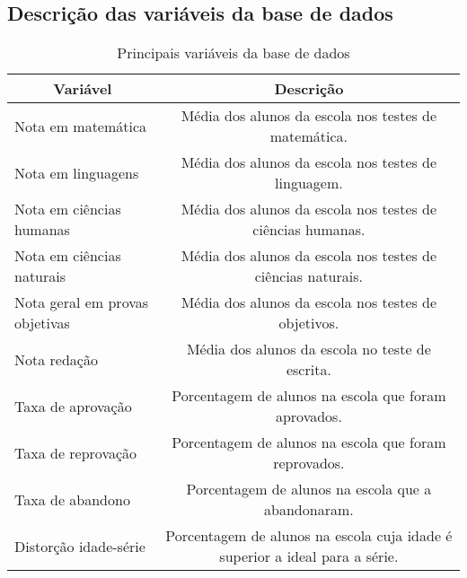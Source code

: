 \documentclass[
        12pt,                           %
        openright,                      %
        oneside,
        a4paper,                        %
        chapter=TITLE,         %
        section=TITLE,         %
        subsection=Title,      %
        english,                        %
        spanish,                        %
        portugues,                      %
        ]{abntex2}
\begin{document}
{%
\begin{apendicesenv}
%
\begin{landscape}

\chapter{Descrição das variáveis da base de dados}\label{apendice_descricao}


\begin{longtable}{cc}
\caption{Principais variáveis da base de dados}\label{tab:descricao_base}

\\ \hline
Variável & Descrição\\
\hline
\endhead
\multicolumn{1}{l|}{Nota em matemática} &
  Média dos alunos da escola nos testes de matemática. \\
  \multicolumn{1}{l|}{Nota em linguagens} &
  Média dos alunos da escola nos testes de linguagem. \\
  \multicolumn{1}{l|}{Nota em ciências humanas} &
  Média dos alunos da escola nos testes de ciências humanas. \\
    \multicolumn{1}{l|}{Nota em ciências naturais} &
  Média dos alunos da escola nos testes de ciências naturais. \\
    \multicolumn{1}{l|}{Nota geral em provas objetivas} &
  Média dos alunos da escola nos testes de objetivos. \\
\multicolumn{1}{l|}{Nota redação}                       & Média dos alunos da escola no teste de escrita.                             \\
\multicolumn{1}{l|}{Taxa de aprovação}                  & Porcentagem de alunos na escola que foram aprovados.                        \\
\multicolumn{1}{l|}{Taxa de reprovação}                 & Porcentagem de alunos na escola que foram reprovados.                       \\
\multicolumn{1}{l|}{Taxa de abandono}                   & Porcentagem de alunos na escola que a abandonaram.                          \\
\multicolumn{1}{l|}{Distorção idade-série}              & Porcentagem de alunos na escola cuja idade é superior a ideal para a série. \\

\end{longtable}
\end{landscape}
\end{apendicesenv}}
\end{document}
